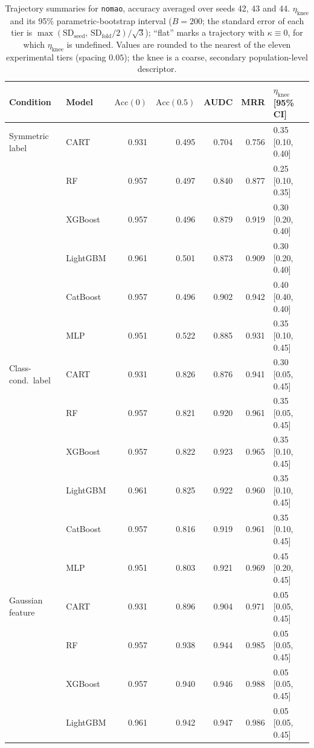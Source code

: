 \begin{table}[p]
\centering
\scriptsize
\setlength{\tabcolsep}{3.5pt}
\caption{Trajectory summaries for \texttt{nomao}, accuracy averaged over seeds 42, 43 and 44. $\eta_{\mathrm{knee}}$ and its 95\% parametric-bootstrap interval ($B=200$; the standard error of each tier is $\max(\mathrm{SD}_{\mathrm{seed}},\,\mathrm{SD}_{\mathrm{fold}}/2)/\sqrt3$); ``flat'' marks a trajectory with $\kappa\equiv 0$, for which $\eta_{\mathrm{knee}}$ is undefined. Values are rounded to the nearest of the eleven experimental tiers (spacing $0.05$); the knee is a coarse, secondary population-level descriptor.}
\label{tab:traj_nomao}
\begin{tabular}{@{}llrrrrl@{}}
\toprule
Condition & Model & $\mathrm{Acc}(0)$ & $\mathrm{Acc}(0.5)$ & AUDC & MRR & $\eta_{\mathrm{knee}}$ [95\% CI] \\
\midrule
Symmetric label & CART & 0.931 & 0.495 & 0.704 & 0.756 & 0.35 [0.10, 0.40] \\
 & RF & 0.957 & 0.497 & 0.840 & 0.877 & 0.25 [0.10, 0.35] \\
 & XGBoost & 0.957 & 0.496 & 0.879 & 0.919 & 0.30 [0.20, 0.40] \\
 & LightGBM & 0.961 & 0.501 & 0.873 & 0.909 & 0.30 [0.20, 0.40] \\
 & CatBoost & 0.957 & 0.496 & 0.902 & 0.942 & 0.40 [0.40, 0.40] \\
 & MLP & 0.951 & 0.522 & 0.885 & 0.931 & 0.35 [0.10, 0.45] \\
\midrule
Class-cond.\ label & CART & 0.931 & 0.826 & 0.876 & 0.941 & 0.30 [0.05, 0.45] \\
 & RF & 0.957 & 0.821 & 0.920 & 0.961 & 0.35 [0.05, 0.45] \\
 & XGBoost & 0.957 & 0.822 & 0.923 & 0.965 & 0.35 [0.10, 0.45] \\
 & LightGBM & 0.961 & 0.825 & 0.922 & 0.960 & 0.35 [0.10, 0.45] \\
 & CatBoost & 0.957 & 0.816 & 0.919 & 0.961 & 0.35 [0.10, 0.45] \\
 & MLP & 0.951 & 0.803 & 0.921 & 0.969 & 0.45 [0.20, 0.45] \\
\midrule
Gaussian feature & CART & 0.931 & 0.896 & 0.904 & 0.971 & 0.05 [0.05, 0.45] \\
 & RF & 0.957 & 0.938 & 0.944 & 0.985 & 0.05 [0.05, 0.45] \\
 & XGBoost & 0.957 & 0.940 & 0.946 & 0.988 & 0.05 [0.05, 0.45] \\
 & LightGBM & 0.961 & 0.942 & 0.947 & 0.986 & 0.05 [0.05, 0.45] \\

\end{tabular}
\end{table}
